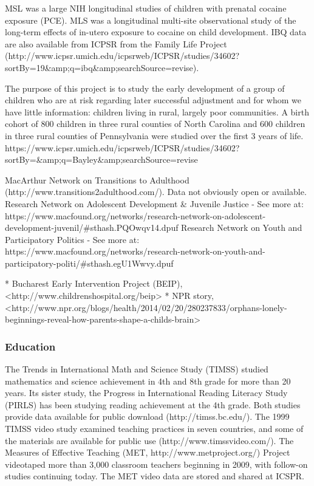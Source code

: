 \documentclass[letterpaper,man,apacite]{apa6}
\begin{document}
MSL was a large NIH longitudinal studies of children with prenatal cocaine exposure (PCE). MLS was a longitudinal multi-site observational study of the long-term effects of in-utero exposure to cocaine on child development.
IBQ data are also available from ICPSR from the Family Life Project (http://www.icpsr.umich.edu/icpsrweb/ICPSR/studies/34602?sortBy=19&amp;q=ibq&amp;searchSource=revise).


The purpose of this project is to study the early development of a group of children who are at risk regarding later successful adjustment and for whom we have little information: children living in rural, largely poor communities. 
A birth cohort of 800 children in three rural counties of North Carolina and 600 children in three rural counties of Pennsylvania were studied over the first 3 years of life.
https://www.icpsr.umich.edu/icpsrweb/ICPSR/studies/34602?sortBy=&amp;q=Bayley&amp;searchSource=revise

MacArthur Network on Transitions to Adulthood (http://www.transitions2adulthood.com/). Data not obviously open or available.
Research Network on Adolescent Development & Juvenile Justice - See more at: https://www.macfound.org/networks/research-network-on-adolescent-development-juvenil/#sthash.PQOwqv14.dpuf
Research Network on Youth and Participatory Politics - See more at: https://www.macfound.org/networks/research-network-on-youth-and-participatory-politi/#sthash.egU1Wwvy.dpuf

* Bucharest Early Intervention Project (BEIP), <http://www.childrenshospital.org/beip>
* NPR story, <http://www.npr.org/blogs/health/2014/02/20/280237833/orphans-lonely-beginnings-reveal-how-parents-shape-a-childs-brain>

\subsubsection{Education}

The Trends in International Math and Science Study (TIMSS) studied mathematics and science achievement in 4th and 8th grade for more than 20 years.
Its sister study, the Progress in International Reading Literacy Study (PIRLS) has been studying reading achievement at the 4th grade.
Both studies provide data available for public download (http://timss.bc.edu/).
The 1999 TIMSS video study examined teaching practices in seven countries, and some of the materials are available for public use (http://www.timssvideo.com/).
The Measures of Effective Teaching (MET, http://www.metproject.org/) Project videotaped more than 3,000 classroom teachers beginning in 2009, with follow-on studies continuing today.
The MET video data are stored and shared at ICSPR.
\end{document}
